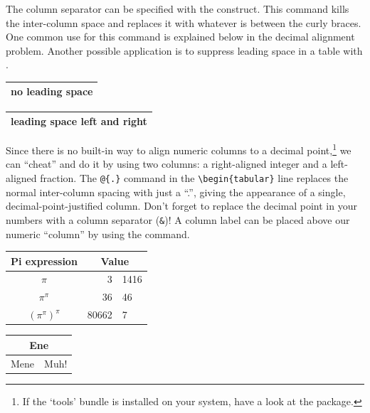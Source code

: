 The column separator can be specified with the 
construct. This command kills the inter-column space and replaces it
with whatever is between the curly braces.  One common use for
this command is explained below in the decimal alignment problem.
Another possible application is to suppress leading space in a table with
.

\begin{example}
\begin{tabular}{@{} l @{}}
\hline 
no leading space\\
\hline
\end{tabular}
\end{example}

\begin{example}
\begin{tabular}{l}
\hline
leading space left and right\\
\hline
\end{tabular}
\end{example}

%
%

 Since there is no built-in way to align
numeric columns to a decimal point,\footnote{If the `tools' bundle is
  installed on your system, have a look at the  package.}
we can ``cheat'' and do it by using two columns: a right-aligned
integer and a left-aligned fraction. The \verb|@{.}| command in the
\verb|\begin{tabular}| line replaces the normal inter-column spacing with
just a ``.'', giving the appearance of a single,
decimal-point-justified column.  Don't forget to replace the decimal
point in your numbers with a column separator (\verb|&|)! A column label
can be placed above our numeric ``column'' by using the
 command.
 
\begin{example}
\begin{tabular}{c r @{.} l}
Pi expression       &
\multicolumn{2}{c}{Value} \\
\hline
$\pi$               & 3&1416  \\
$\pi^{\pi}$         & 36&46   \\
$(\pi^{\pi})^{\pi}$ & 80662&7 \\
\end{tabular}
\end{example}

\begin{example}
\begin{tabular}{|c|c|}
\hline
\multicolumn{2}{|c|}{Ene} \\
\hline
Mene & Muh! \\
\hline
\end{tabular}
\end{example}

